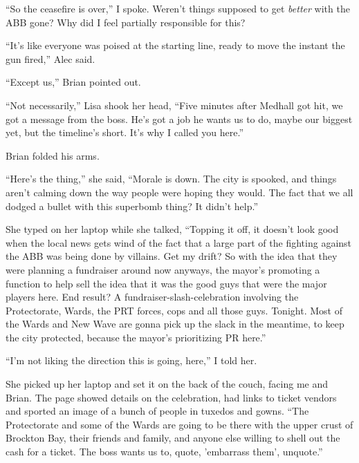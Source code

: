 ``So the ceasefire is over,'' I spoke.  Weren't things supposed to get \emph{better} with the ABB gone?  Why did I feel partially responsible for this?



``It's like everyone was poised at the starting line, ready to move the instant the gun fired,'' Alec said.



``Except us,'' Brian pointed out.



``Not necessarily,'' Lisa shook her head, ``Five minutes after Medhall got hit, we got a message from the boss.  He's got a job he wants us to do, maybe our biggest yet, but the timeline's short.  It's why I called you here.''



Brian folded his arms.



``Here's the thing,'' she said, ``Morale is down.  The city is spooked, and things aren't calming down the way people were hoping they would.  The fact that we all dodged a bullet with this superbomb thing?  It didn't help.''



She typed on her laptop while she talked, ``Topping it off, it doesn't look good when the local news gets wind of the fact that a large part of the fighting against the ABB was being done by villains.  Get my drift?  So with the idea that they were planning a fundraiser around now anyways, the mayor's promoting a function to help sell the idea that it was the good guys that were the major players here.  End result?  A fundraiser-slash-celebration involving the Protectorate, Wards, the PRT forces, cops and all those guys.  Tonight.  Most of the Wards and New Wave are gonna pick up the slack in the meantime, to keep the city protected, because the mayor's prioritizing PR here.''



``I'm not liking the direction this is going, here,'' I told her.



She picked up her laptop and set it on the back of the couch, facing me and Brian.  The page showed details on the celebration, had links to ticket vendors and sported an image of a bunch of people in tuxedos and gowns.   ``The Protectorate and some of the Wards are going to be there with the upper crust of Brockton Bay, their friends and family, and anyone else willing to shell out the cash for a ticket.  The boss wants us to, quote, 'embarrass them', unquote.''



